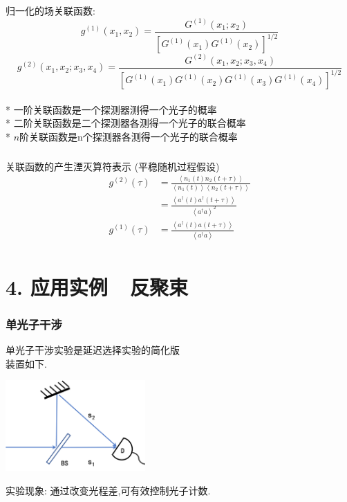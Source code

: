    \begin{frame} 
    \frametitle{}
    归一化的场关联函数:
        \[g^{(1)} (x_1,x_2)= \frac{G^{(1)}(x_1; x_2) }{[G^{(1)}(x_1) G^{(1)}(x_2)]^{1/2} }\]
        \[g^{(2)} (x_1, x_2; x_3,x_4)= \frac{G^{(2)}(x_1,x_2; x_3, x_4) }{[G^{(1)}(x_1) G^{(1)}(x_2)G^{(1)}(x_3) G^{(1)}(x_4)]^{1/2} }\]
    ~\\ {\vspace*{1.3em}}
   * 一阶关联函数是一个探测器测得一个光子的概率\\ 
   * 二阶关联函数是二个探测器各测得一个光子的联合概率 \\ 
   * $n$阶关联函数是n个探测器各测得一个光子的联合概率 
   \end{frame}
\begin{frame} [label=current] 
\frametitle{}
    关联函数的产生湮灭算符表示 (平稳随机过程假设)
    \[ \begin{aligned}
        g^{(2)}(\tau) 
        &=  \frac{\left\langle n_1 (t)  n_2 (t+ \tau)\right\rangle}{\left\langle n_1 (t)\right\rangle \left\langle n_2 (t+ \tau)\right\rangle} \\ 
        &=  \frac{\left\langle a^{\dagger} (t)  a^{\dagger} (t+ \tau)\right\rangle}{\left\langle a^{\dagger} a \right\rangle ^2} \\
        g^{(1)}(\tau) &=  \frac{\left\langle a^{\dagger} (t)  a (t+ \tau)\right\rangle}{\left\langle a^{\dagger} a \right\rangle } \\
    \end{aligned}\] 
\end{frame}

\section{4. 应用实例~~反聚束}

   \begin{frame} 
    \frametitle{单光子干涉}
        单光子干涉实验是延迟选择实验的简化版\\ 
        装置如下.
          \begin{center}
               \includegraphics[width=0.4\textwidth]{figs/19.png}
          \end{center}
        实验现象: 通过改变光程差,可有效控制光子计数.
   \end{frame}

